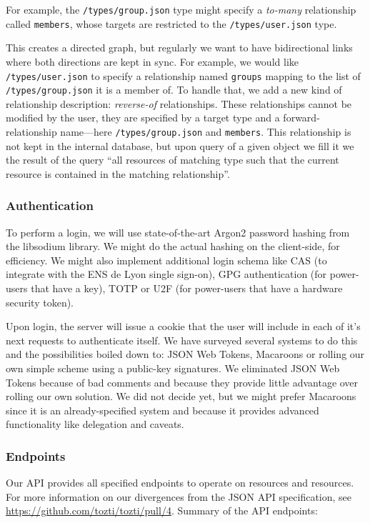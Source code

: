 \documentclass[a4paper, english]{report}
\begin{document}
For example, the \texttt{/types/group.json} type might specify a \emph{to-many} relationship called \texttt{members}, whose targets are restricted to the \texttt{/types/user.json} type.

This creates a directed graph, but regularly we want to have bidirectional links where both directions are kept in sync. For example, we would like \texttt{/types/user.json} to specify a relationship named \texttt{groups} mapping to the list of \texttt{/types/group.json} it is a member of. To handle that, we add a new kind of relationship description: \emph{reverse-of} relationships. These relationships cannot be modified by the user, they are specified by a target type and a forward-relationship name---here \texttt{/types/group.json} and \texttt{members}. This relationship is not kept in the internal database, but upon query of a given object we fill it we the result of the query ``all resources of matching type such that the current resource is contained in the matching relationship''.

\subsubsection{Authentication}
To perform a login, we will use state-of-the-art Argon2 password hashing from the libsodium\cite{libsodium} library. We might do the actual hashing on the client-side, for efficiency. We might also implement additional login schema like CAS (to integrate with the ENS de Lyon single sign-on), GPG authentication (for power-users that have a key), TOTP\cite{rfc6238} or U2F\cite{U2F} (for power-users that have a hardware security token).

Upon login, the server will issue a cookie that the user will include in each of it's next requests to authenticate itself. We have surveyed several systems to do this and the possibilities boiled down to: JSON Web Tokens\cite{jwt}, Macaroons\cite{macaroons} or rolling our own simple scheme using a public-key signatures. We eliminated JSON Web Tokens because of bad comments\cite{jwthn} and because they provide little advantage over rolling our own solution. We did not decide yet, but we might prefer Macaroons since it is an already-specified system and because it provides advanced functionality like delegation and caveats.

\subsubsection{Endpoints}
Our API provides all specified endpoints to operate on resources and resources. For more information on our divergences from the JSON API specification, see \url{https://github.com/tozti/tozti/pull/4}. Summary of the API endpoints:
\end{document}
